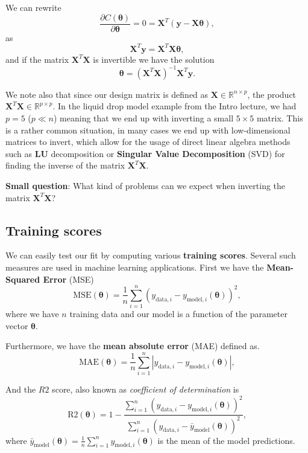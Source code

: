 \documentclass[%
oneside,                 %
final,                   %
10pt]{article}
\newenvironment{block_mdfboxadmon}[1][]{
\begin{block_mdfboxmdframed}[frametitle=#1]
}
{
\end{block_mdfboxmdframed}
}
\begin{document}
\begin{block_mdfboxadmon}[]
We can rewrite
\[
\frac{\partial C(\bm{\theta})}{\partial \bm{\theta}} = 0 = \bm{X}^T\left( \bm{y}-\bm{X}\bm{\theta}\right),  
\]
as
\[
\bm{X}^T\bm{y} = \bm{X}^T\bm{X}\bm{\theta},  
\]
and if the matrix $\bm{X}^T\bm{X}$ is invertible we have the solution
\[
\bm{\theta} =\left(\bm{X}^T\bm{X}\right)^{-1}\bm{X}^T\bm{y}.
\]

We note also that since our design matrix is defined as $\bm{X}\in
{\mathbb{R}}^{n\times p}$, the product $\bm{X}^T\bm{X} \in
{\mathbb{R}}^{p\times p}$.  In the liquid drop model example from the Intro lecture, we had $p=5$ ($p \ll n$) meaning that we end up with inverting a small
$5\times 5$ matrix. This is a rather common situation, in many cases we end up with low-dimensional
matrices to invert, which
allow for the usage of direct linear algebra methods such as \textbf{LU} decomposition or \textbf{Singular Value Decomposition} (SVD) for finding the inverse of the matrix
$\bm{X}^T\bm{X}$.
\end{block_mdfboxadmon} %




\begin{block_mdfboxadmon}[]
\textbf{Small question}: What kind of problems can we expect when inverting the matrix  $\bm{X}^T\bm{X}$?
\end{block_mdfboxadmon} %



\subsection{Training scores}

We can easily test our fit by computing various \textbf{training scores}. Several such measures are used in machine learning applications. First we have the \textbf{Mean-Squared Error} (MSE)
\[
\mathrm{MSE}(\bm{\theta}) = \frac{1}{n} \sum_{i=1}^n \left( y_{\mathrm{data},i} - y_{\mathrm{model},i}(\bm{\theta}) \right)^2,
\]
where we have $n$ training data and our model is a function of the parameter vector $\bm{\theta}$.

Furthermore, we have the \textbf{mean absolute error} (MAE) defined as.
\[
\mathrm{MAE}(\bm{\theta}) = \frac{1}{n} \sum_{i=1}^n \left| y_{\mathrm{data},i} - y_{\mathrm{model},i}(\bm{\theta}) \right|,
\]

And the $R2$ score, also known as \emph{coefficient of determination} is
\[
\mathrm{R2}(\bm{\theta}) = 1 - \frac{\sum_{i=1}^n \left( y_{\mathrm{data},i} - y_{\mathrm{model},i}(\bm{\theta}) \right)^2}{\sum_{i=1}^n \left( y_{\mathrm{data},i} - \bar{y}_\mathrm{model}(\bm{\theta}) \right)^2},
\]
where $\bar{y}_\mathrm{model}(\bm{\theta}) = \frac{1}{n} \sum_{i=1}^n y_{\mathrm{model},i} (\bm{\theta})$ is the mean of the model predictions.
\end{document}
